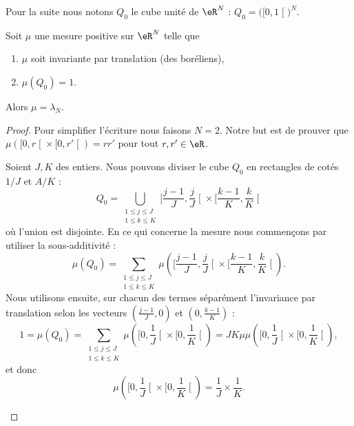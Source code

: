 Pour la suite nous notons \( Q_0\) le cube unité de \( \eR^N\) : \( Q_0=\big( \mathopen[ 0 , 1 \mathclose[ \big)^N\).

\begin{theorem}        \label{ThoCABFooHbUzWc}
    Soit \( \mu\) une mesure positive sur \( \eR^N\) telle que
    \begin{enumerate}
        \item
            \( \mu\) soit invariante par translation (des boréliens),
        \item
            \( \mu(Q_0)=1\).
    \end{enumerate}
    Alors \( \mu=\lambda_N\).
\end{theorem}
    
\begin{proof}
    Pour simplifier l'écriture nous faisons \( N=2\). Notre but est de prouver que \( \mu(  \mathopen[ 0 , r \mathclose[\times \mathopen[ 0 , r' \mathclose[ )=rr'\) pour tout \( r,r'\in \eR\).

    \begin{subproof}
    \item[Longueur =\( 1/J\)]
        Soient \( J,K\) des entiers. Nous pouvons diviser le cube \( Q_0\) en rectangles de cotés \( 1/J\) et \( A/K\) :
        \begin{equation}
            Q_0=\bigcup_{\substack{1\leq j\leq J\\1\leq k\leq K}}\mathopen[ \frac{ j-1 }{ J } , \frac{ j }{ J } \mathclose[\times \mathopen[ \frac{ k-1 }{ K } , \frac{ k }{ K } \mathclose[
        \end{equation}
        où l'union est disjointe. En ce qui concerne la mesure nous commençons par utiliser la sous-additivité :
        \begin{equation}
            \mu(Q_0)=\sum_{\substack{1\leq j\leq J\\1\leq k\leq K}}\mu\left(  \mathopen[ \frac{ j-1 }{ J } , \frac{ j }{ J } \mathclose[\times \mathopen[ \frac{ k-1 }{ K } , \frac{ k }{ K } \mathclose[      \right).
        \end{equation}
        Nous utilisons ensuite, sur chacun des termes séparément l'invariance par translation selon les vecteurs \( (\frac{ j-1 }{ J },0)\) et \( ( 0,\frac{ k-1 }{ K } )\) :
        \begin{equation}
            1=\mu(Q_0)=\sum_{\substack{1\leq j\leq J\\1\leq k\leq K}}\mu\left(  \mathopen[ 0,\frac{1}{ J } \mathclose[\times \mathopen[0,\frac{1}{ K }\mathclose[      \right)=JK\mu\mu\left(  \mathopen[ 0,\frac{1}{ J } \mathclose[\times \mathopen[0,\frac{1}{ K }\mathclose[      \right),
        \end{equation}
        et donc
        \begin{equation}
            \mu\left(  \mathopen[ 0,\frac{1}{ J } \mathclose[\times \mathopen[0,\frac{1}{ K }\mathclose[      \right)=\frac{1}{ J }\times \frac{1}{ K }.
        \end{equation}
    \item[Longueur \( L/K\)]


\end{subproof}
\end{proof}
